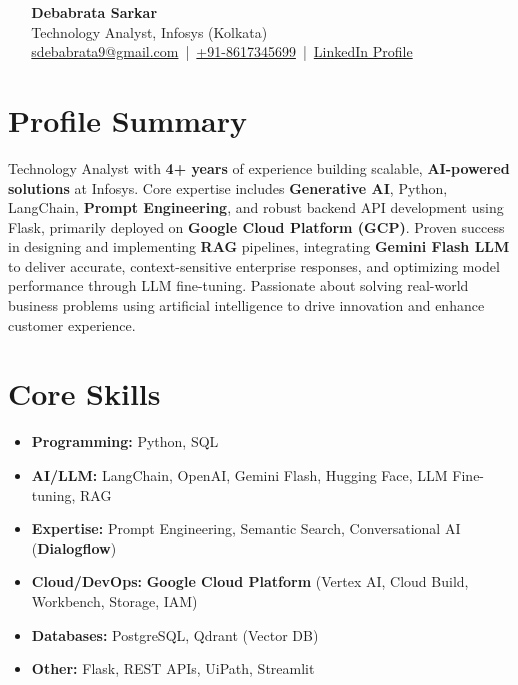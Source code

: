 \documentclass[a4paper,11pt]{article}
\begin{document}
\begin{center}
    {\Huge \bfseries Debabrata Sarkar} \\[12pt]
    Technology Analyst, Infosys (Kolkata) \\[6pt]
    \href{mailto:sdebabrata9@gmail.com}{sdebabrata9@gmail.com} \,|\, \href{tel:+918617345699}{+91-8617345699} \,|\, \href{https://www.linkedin.com/in/debabrata-sarkar-genai/}{LinkedIn Profile}
\end{center}

\vspace{8pt} %

\section*{Profile Summary}
Technology Analyst with \textbf{4+ years} of experience building scalable, \textbf{AI-powered solutions} at Infosys. Core expertise includes \textbf{Generative AI}, Python, LangChain, \textbf{Prompt Engineering}, and robust backend API development using Flask, primarily deployed on \textbf{Google Cloud Platform (GCP)}. Proven success in designing and implementing \textbf{RAG} pipelines, integrating \textbf{Gemini Flash LLM} to deliver accurate, context-sensitive enterprise responses, and optimizing model performance through LLM fine-tuning. Passionate about solving real-world business problems using artificial intelligence to drive innovation and enhance customer experience.

\section*{Core Skills}
\begin{itemize}
    \item \textbf{Programming:} Python, SQL
    \item \textbf{AI/LLM:} LangChain, OpenAI, Gemini Flash, Hugging Face, LLM Fine-tuning, RAG
    \item \textbf{Expertise:} Prompt Engineering, Semantic Search, Conversational AI (\textbf{Dialogflow})
    \item \textbf{Cloud/DevOps:} \textbf{Google Cloud Platform} (Vertex AI, Cloud Build, Workbench, Storage, IAM)
    \item \textbf{Databases:} PostgreSQL, Qdrant (Vector DB)
    \item \textbf{Other:} Flask, REST APIs, UiPath, Streamlit
\end{itemize}
\vspace{4pt} %
\end{document}
